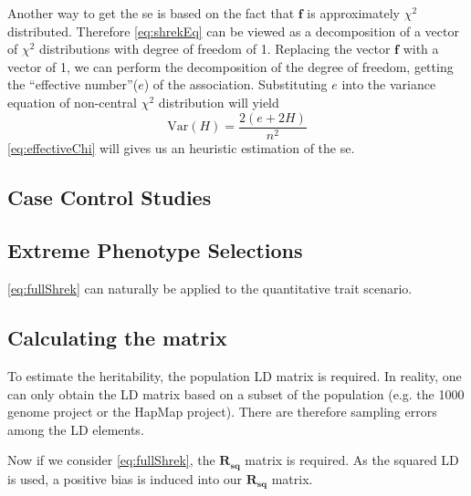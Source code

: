 			Another way to get the \gls{se} is based on the fact that $\boldsymbol{f}$ is approximately $\chi^2$ distributed. 
			Therefore \cref{eq:shrekEq} can be viewed as a decomposition of a vector of $\chi^2$ distributions with degree of freedom of 1. 
			Replacing the vector $\boldsymbol{f}$ with a vector of 1, we can perform the decomposition of the degree of freedom, getting the ``effective number''($e$) of the association\citep{Li2011b}. 
			Substituting $e$ into the variance equation of non-central $\chi^2$ distribution will yield
			\begin{equation}
			\mathrm{Var}(H) = \frac{2(e+2H)}{n^2}
			\label{eq:effectiveChi}
			\end{equation}
			 \cref{eq:effectiveChi} will gives us an heuristic estimation of the \gls{se}. 
		\subsection{Case Control Studies}	 
		\subsection{Extreme Phenotype Selections}
		\cref{eq:fullShrek} can naturally be applied to the quantitative trait scenario. 
		\subsection{Calculating the  matrix}
			To estimate the heritability, the population \gls{LD} matrix is required.
			In reality, one can only obtain the \gls{LD} matrix based on a subset of the population (e.g. the 1000 genome project\parencite{Project2012} or the HapMap project\parencite{Altshuler2010}).
			There are therefore sampling errors among the \gls{LD} elements. 
			
			Now if we consider \cref{eq:fullShrek}, the $\boldsymbol{R_{sq}}$ matrix is required.
			As the squared \gls{LD} is used, a positive bias is induced into our $\boldsymbol{R_{sq}}$ matrix. 
			
